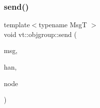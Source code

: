 \mbox{\label{namespacevt_1_1objgroup_aa2e134493c6b8a23d7d5e86bd9df1a70}} 
\subsubsection{\texorpdfstring{send()}{send()}}
{\footnotesize\ttfamily template$<$typename MsgT $>$ \\
void vt\+::objgroup\+::send (\begin{DoxyParamCaption}\item[{\hyperlink{namespacevt_ab2b3d506ec8e8d1540aede826d84a239}{Msg\+Shared\+Ptr}$<$ MsgT $>$}]{msg,  }\item[{\hyperlink{namespacevt_af64846b57dfcaf104da3ef6967917573}{Handler\+Type}}]{han,  }\item[{\hyperlink{namespacevt_a866da9d0efc19c0a1ce79e9e492f47e2}{Node\+Type}}]{node }\end{DoxyParamCaption})}

